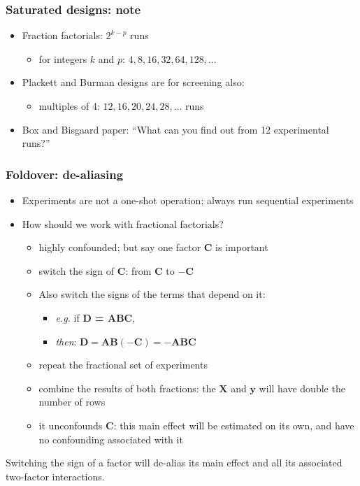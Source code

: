 \begin{frame}\frametitle{Saturated designs: note}
	\begin{itemize}
		\item	Fraction factorials: $2^{k-p}$ runs
		\begin{itemize}
			\item	for integers $k$ and $p$: $4, 8, 16, 32, 64, 128, \ldots$
		\end{itemize}
		\item	Plackett and Burman designs are for screening also:
		\begin{itemize}
			\item	multiples of 4: $12, 16, 20, 24, 28, \ldots$ runs
		\end{itemize}
		\item	Box and Bisgaard paper: ``What can you find out from 12 experimental runs?''
	\end{itemize}
\end{frame}

\begin{frame}\frametitle{Foldover: de-aliasing}
	\begin{itemize}
		\item	Experiments are not a one-shot operation; always run sequential experiments
		\item	How should we work with fractional factorials?
		\begin{itemize}
			\item	highly confounded; but say one factor \textbf{C} is important
			\item	switch the sign of \textbf{C}: from \textbf{C} to $\mathbf{-C}$
			\item	Also switch the signs of the terms that depend on it:
			\begin{itemize}
				\item	\emph{e.g.} if \textbf{D = ABC},
				\item	\emph{then}: $\mathbf{D} = \mathbf{AB}(\mathbf{-C}) = \mathbf{-ABC}$
			\end{itemize}
			\item	repeat the fractional set of experiments
			\item	combine the results of both fractions: the $\mathbf{X}$ and $\mathbf{y}$ will have double the number of rows
			\item	it unconfounds \textbf{C}: this main effect will be estimated on its own, and have no confounding associated with it
		\end{itemize}
	\end{itemize}

	Switching the sign of a factor will de-alias its main effect and all its associated two-factor interactions.
\end{frame}

